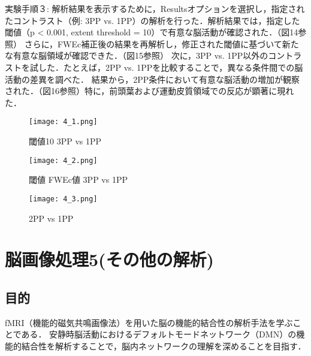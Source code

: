 \documentclass{jlreq}
\begin{document}
実験手順３: 解析結果を表示するために，Resultsオプションを選択し，指定されたコントラスト（例: 3PP vs. 1PP）の解析を行った．解析結果では，指定した閾値（p < 0.001, extent threshold = 10）で有意な脳活動が確認された．（図14参照）
さらに，FWEc補正後の結果を再解析し，修正された閾値に基づいて新たな有意な脳領域が確認できた．（図15参照）
次に，3PP vs. 1PP以外のコントラストを試した．たとえば，2PP vs. 1PPを比較することで，異なる条件間での脳活動の差異を調べた．
結果から，2PP条件において有意な脳活動の増加が観察された．（図16参照）特に，前頭葉および運動皮質領域での反応が顕著に現れた．
\begin{figure}[H]
    \centering
        \begin{minipage}{0.4\textwidth}
        \centering
        \texttt{[image: 4\_1.png]}
        \caption{閾値10 3PP vs 1PP}
        \label{fig:brain_T1}
    \end{minipage}
    \hfill
    \begin{minipage}{0.4\textwidth}
        \centering
        \texttt{[image: 4\_2.png]}
        \caption{閾値 FWEc値 3PP vs 1PP}
        \label{fig:brain_T1}
    \end{minipage}
    \hfill
\end{figure}


\begin{figure}[H]
    \centering
        \begin{minipage}{0.4\textwidth}
        \centering
        \texttt{[image: 4\_3.png]}
        \caption{2PP vs 1PP}
        \label{fig:brain_T1}
    \end{minipage}

\end{figure}
\section{脳画像処理5(その他の解析)}
\subsection{目的}
fMRI（機能的磁気共鳴画像法）を用いた脳の機能的結合性の解析手法を学ぶことである．
安静時脳活動におけるデフォルトモードネットワーク（DMN）の機能的結合性を解析することで，脳内ネットワークの理解を深めることを目指す．
\end{document}
